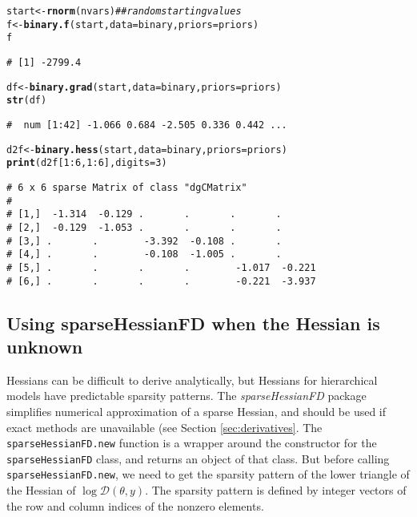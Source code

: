 \documentclass[10pt]{article}\usepackage[]{graphicx}\usepackage[]{color}
\makeatletter
\newcommand{\hlnum}[1]{\textcolor[rgb]{0.686,0.059,0.569}{#1}}%
\newcommand{\hlcom}[1]{\textcolor[rgb]{0.678,0.584,0.686}{\textit{#1}}}%
\newcommand{\hlopt}[1]{\textcolor[rgb]{0,0,0}{#1}}%
\newcommand{\hlstd}[1]{\textcolor[rgb]{0.345,0.345,0.345}{#1}}%
\newcommand{\hlkwb}[1]{\textcolor[rgb]{0.69,0.353,0.396}{#1}}%
\newcommand{\hlkwc}[1]{\textcolor[rgb]{0.333,0.667,0.333}{#1}}%
\newcommand{\hlkwd}[1]{\textcolor[rgb]{0.737,0.353,0.396}{\textbf{#1}}}%
\newenvironment{kframe}{%
 \def\at@end@of@kframe{}%
 \ifinner\ifhmode%
  \def\at@end@of@kframe{\end{minipage}}%
  \begin{minipage}{\columnwidth}%
 \fi\fi%
 \def\FrameCommand##1{\hskip\@totalleftmargin \hskip-\fboxsep
 \colorbox{shadecolor}{##1}\hskip-\fboxsep
     \hskip-\linewidth \hskip-\@totalleftmargin \hskip\columnwidth}%
 \MakeFramed {\advance\hsize-\width
   \@totalleftmargin\z@ \linewidth\hsize
   \@setminipage}}%
 {\par\unskip\endMakeFramed%
 \at@end@of@kframe}
\newenvironment{knitrout}{}{} %
\renewenvironment{knitrout}{\begin{singlespace}}{\end{singlespace}}
\newcommand{\pkg}[1]{\emph{#1}}
\newcommand{\func}[1]{\texttt{#1}}
\newcommand{\class}[1]{\texttt{#1}}
\newcommand{\Dy}{\mathcal{D}(\theta,y)}
\makeatother
\begin{document}
\begin{knitrout}
\color{fgcolor}\begin{kframe}
\begin{alltt}
\hlstd{start} \hlkwb{<-} \hlkwd{rnorm}\hlstd{(nvars)} \hlcom{## random starting values}
\hlstd{f} \hlkwb{<-} \hlkwd{binary.f}\hlstd{(start,} \hlkwc{data}\hlstd{=binary,} \hlkwc{priors}\hlstd{=priors)}
\hlstd{f}
\end{alltt}
\begin{verbatim}
# [1] -2799.4
\end{verbatim}
\begin{alltt}
\hlstd{df} \hlkwb{<-} \hlkwd{binary.grad}\hlstd{(start,} \hlkwc{data}\hlstd{=binary,} \hlkwc{priors}\hlstd{=priors)}
\hlkwd{str}\hlstd{(df)}
\end{alltt}
\begin{verbatim}
#  num [1:42] -1.066 0.684 -2.505 0.336 0.442 ...
\end{verbatim}
\begin{alltt}
\hlstd{d2f} \hlkwb{<-} \hlkwd{binary.hess}\hlstd{(start,} \hlkwc{data}\hlstd{=binary,} \hlkwc{priors}\hlstd{=priors)}
\hlkwd{print}\hlstd{(d2f[}\hlnum{1}\hlopt{:}\hlnum{6}\hlstd{,}\hlnum{1}\hlopt{:}\hlnum{6}\hlstd{],} \hlkwc{digits}\hlstd{=}\hlnum{3}\hlstd{)}
\end{alltt}
\begin{verbatim}
# 6 x 6 sparse Matrix of class "dgCMatrix"
#                                                     
# [1,]  -1.314  -0.129 .       .       .       .      
# [2,]  -0.129  -1.053 .       .       .       .      
# [3,] .       .        -3.392  -0.108 .       .      
# [4,] .       .        -0.108  -1.005 .       .      
# [5,] .       .       .       .        -1.017  -0.221
# [6,] .       .       .       .        -0.221  -3.937
\end{verbatim}
\end{kframe}
\end{knitrout}

\subsection{Using sparseHessianFD when the Hessian is unknown}

Hessians can be difficult to derive analytically, but Hessians for hierarchical models
have predictable sparsity patterns. The
\pkg{sparseHessianFD} package simplifies numerical approximation of a
sparse Hessian, and should be used if exact
methods are unavailable (see Section \ref{sec:derivatives}.   The
\func{sparseHessianFD.new} function is a wrapper around the
constructor for the \class{sparseHessianFD} class, and returns an
object of that class.  But before calling \func{sparseHessianFD.new},
we need to get the sparsity pattern of the lower triangle of the
Hessian of $\log\Dy$. The sparsity pattern is defined
by integer vectors of the row and column indices of the nonzero elements.
\end{document}
